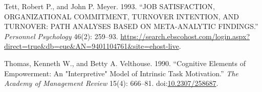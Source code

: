 \documentclass[
  11pt,
  a4paper,
]{article}
\newlength{\cslhangindent}
\newenvironment{CSLReferences}[2] %
 {\begin{list}{}{%
  \setlength{\itemindent}{0pt}
  \setlength{\leftmargin}{0pt}
  \setlength{\parsep}{0pt}
  \ifodd #1
   \setlength{\leftmargin}{\cslhangindent}
   \setlength{\itemindent}{-1\cslhangindent}
  \fi
  \setlength{\itemsep}{#2\baselineskip}}}
 {\end{list}}
\begin{document}
\begin{CSLReferences}{1}{1}
Tett, Robert P., and John P. Meyer. 1993. {``{JOB SATISFACTION},
{ORGANIZATIONAL COMMITMENT}, {TURNOVER INTENTION}, {AND TURNOVER}: {PATH
ANALYSES BASED ON META-ANALYTIC FINDINGS}.''} \emph{Personnel
Psychology} 46(2): 259--93.
\url{https://search.ebscohost.com/login.aspx?direct=true&db=eue&AN=9401104761&site=ehost-live}.

Thomas, Kenneth W., and Betty A. Velthouse. 1990. {``Cognitive
{Elements} of {Empowerment}: {An} "{Interpretive}" {Model} of {Intrinsic
Task Motivation}.''} \emph{The Academy of Management Review} 15(4):
666--81. doi:\href{https://doi.org/10.2307/258687}{10.2307/258687}.

\end{CSLReferences}
\end{document}
